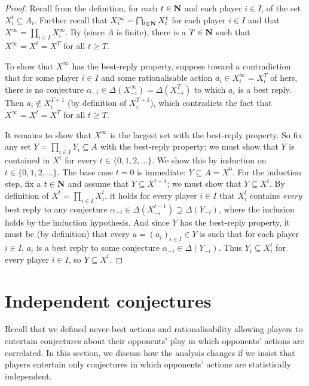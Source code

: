 \begin{proof}
	Recall from  the definition, for each $t \in \mathbf{N}$ and each player $i \in I$, of the set $X^t_i \subseteq A_i$. Further recall that $X^\infty_i = \bigcap_{t \in \mathbf{N}} X^t_i$ for each player $i \in I$ and that $X^\infty = \prod_{i \in I} X^\infty_i$. By  (since $A$ is finite), there is a $T \in \mathbf{N}$ such that $X^\infty = X^t = X^T$ for all $t \geq T$.
	
	To show that $X^\infty$ has the best-reply property, suppose toward a contradiction that for some player $i \in I$ and some rationalisable action $a_i \in X^\infty_i = X^T_i$ of hers, there is no conjecture $\alpha_{-i} \in \Delta(X^\infty_{-i}) = \Delta(X^T_{-i})$ to which $a_i$ is a best reply. Then $a_i \notin X^{T+1}_i$ (by definition of $X^{T+1}_i$), which contradicts the fact that $X^\infty = X^t = X^T$ for all $t \geq T$.

	It remains to show that $X^\infty$ is the largest set with the best-reply property. So fix any set $Y = \prod_{i \in I} Y_i \subseteq A$ with the best-reply property; we must show that $Y$ is contained in $X^t$ for every $t \in \{0,1,2,\dots\}$. We show this by induction on $t \in \{0,1,2,\dots\}$. The base case $t=0$ is immediate: $Y \subseteq A = X^0$. For the induction step, fix a $t \in \mathbf{N}$ and assume that $Y \subseteq X^{t-1}$; we must show that $Y \subseteq X^t$. By definition of $X^t = \prod_{i \in I} X^t_i$, it holds for every player $i \in I$ that $X^t_i$ contains \emph{every} best reply to any conjecture $\alpha_{-i} \in \Delta( X^{t-1}_{-i} ) \supseteq \Delta( Y_{-i} )$, where the inclusion holds by the induction hypothesis. And since $Y$ has the best-reply property, it must be (by definition) that every $a = (a_i)_{i \in I} \in Y$ is such that for each player $i \in I$, $a_i$ is a best reply to some conjecture $\alpha_{-i} \in \Delta( Y_{-i} )$. Thus $Y_i \subseteq X^t_i$ for every player $i \in I$, so $Y \subseteq X^t$.
\end{proof}



\section{Independent conjectures}
\label{dom:indp}

Recall that we defined never-best actions and rationalisability allowing players to entertain conjectures about their opponents' play in which opponents' actions are correlated. In this section, we discuss how the analysis changes if we insist that players entertain only conjectures in which opponents' actions are statistically independent.

